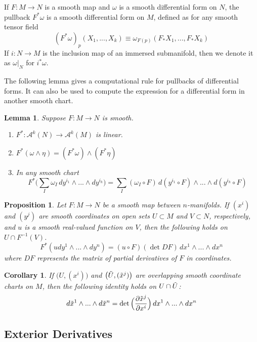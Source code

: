 \documentclass{article}
\newtheorem{proposition}[theorem]{Proposition}
\newtheorem{lemma}[theorem]{Lemma}
\newtheorem{corollary}{Corollary}[theorem]
\theoremstyle{remark}
\theoremstyle{definition}
\begin{document}
If $F: M \longrightarrow N$ is a smooth map and $\omega$ is a smooth differential form on $N$, the pullback $F^* \omega$ is a smooth differential form on $M$, defined as for any smooth tensor field 
\[(F^* \omega)_p (X_1, ..., X_k) \equiv \omega_{F(p)} (F_* X_1, ..., F_* X_k)\]
If $i: N \longrightarrow M$ is the inclusion map of an immersed submanifold, then we denote it as $\omega \big|_N$ for $i^* \omega$. 

The following lemma gives a computational rule for pullbacks of differential forms. It can also be used to compute the expression for a differential form in another smooth chart. 
\begin{lemma}
Suppose $F: M \longrightarrow N$ is smooth. 
\begin{enumerate}
    \item $F^*: \mathcal{A}^k (N) \longrightarrow \mathcal{A}^k (M)$ is linear. 
    \item $F^* (\omega \wedge \eta) = (F^* \omega) \wedge (F^* \eta)$
    \item In any smooth chart 
    \[F^* \Big( \sum_I \omega_I \, dy^{i_1} \wedge ... \wedge dy^{i_k} \Big) = \sum_I (\omega_I \circ F) \, d(y^{i_1} \circ F) \wedge ... \wedge d(y^{i_k} \circ F)\]
\end{enumerate}
\end{lemma}

\begin{proposition}
Let $F: M \longrightarrow N$ be a smooth map between $n$-manifolds. If $(x^i)$ and $(y^j)$ are smooth coordinates on open sets $U \subset M$ and $V \subset N$, respectively, and $u$ is a smooth real-valued function on $V$, then the following holds on $U \cap F^{-1} (V)$. 
\[F^* (u dy^1 \wedge ... \wedge dy^n) = (u \circ F) (\det{DF})\, dx^1 \wedge ... \wedge dx^n\]
where $DF$ represents the matrix of partial derivatives of $F$ in coordinates. 
\end{proposition}

\begin{corollary}
If $\big(U, (x^i)\big)$ and $\big(\Tilde{U}, (\Tilde{x}^j)\big)$ are overlapping smooth coordinate charts on $M$, then the following identity holds on $U \cap \Tilde{U}$:
\[d\Tilde{x}^1 \wedge ... \wedge d\Tilde{x}^n = \det \Big( \frac{\partial \Tilde{x}^j}{\partial x^i}\Big)\, dx^1 \wedge ... \wedge dx^n\]
\end{corollary}

\subsection{Exterior Derivatives}
\end{document}
